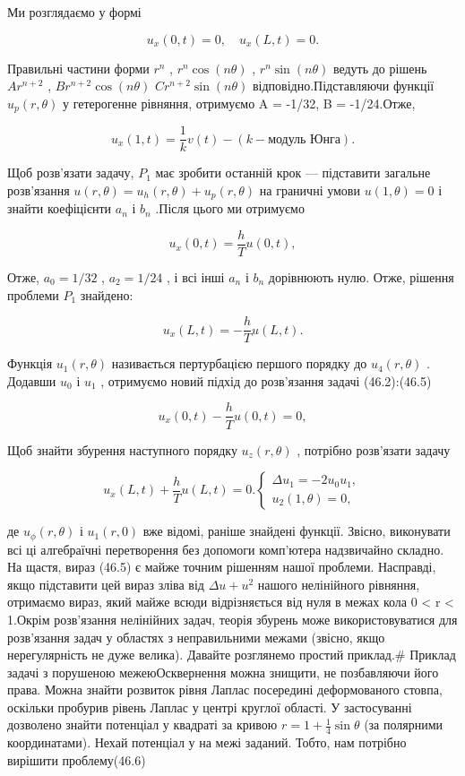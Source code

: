 \documentclass[
  ukrainian,
]{article}
\begin{document}
Ми розглядаємо у формі

\[
u_x(0, t) = 0, \quad u_x(L, t) = 0.
\]

Правильні частини форми \(r^n\) , \(r^n \cos{(n\theta)}\) ,
\(r^n \sin{(n\theta)}\) ведуть до рішень \(Ar^{n+2}\) ,
\(Br^{n+2} \cos{(n\theta)}\) \(Cr^{n+2} \sin{(n\theta)}\)
відповідно.Підставляючи функції \(u_p(r, \theta)\) у гетерогенне
рівняння, отримуємо A = -1/32, B = -1/24.Отже,

\[
u_{x}(1, t) = \frac{1}{k} v(t) - (k - \text{модуль Юнга}).
\]

Щоб розв'язати задачу, \(P_1\) має зробити останній крок --- підставити
загальне розв'язання \(u(r, \theta) = u_h(r, \theta) + u_p(r, \theta)\)
на граничні умови \(u(1, \theta) = 0\) і знайти коефіцієнти \(a_n\) і
\(b_n\) .Після цього ми отримуємо

\[
u_{x}(0, t) = \frac{h}{T} u(0, t),
\]

Отже, \(a_0=1/32\) , \(a_2=1/24\) , і всі інші \(a_n\) і \(b_n\)
дорівнюють нулю. Отже, рішення проблеми \(P_1\) знайдено:

\[
u_{x}(L, t) = -\frac{h}{T} u(L, t).
\]

Функція \(u_1(r, \theta)\) називається пертурбацією першого порядку до
\(u_4(r, \theta)\) . Додавши \(u_0\) і \(u_1\) , отримуємо новий підхід
до розв'язання задачі (46.2):(46.5)

\[
u_{x}(0, t) - \frac{h}{T}u(0, t) = 0,
\]

Щоб знайти збурення наступного порядку \(u_{z}(r, \theta)\) , потрібно
розв'язати задачу

\[
u_{x}(L, t) + \frac{h}{T}u(L, t) = 0.
\begin{cases} \Delta u_{1} = -2u_{0}u_{1}, \\ u_{2}(1, \theta) = 0, \end{cases}
\]

де \(u_{\phi}(r,\theta)\) і \(u_{1}(r,0)\) вже відомі, раніше знайдені
функції. Звісно, виконувати всі ці алгебраїчні перетворення без допомоги
комп'ютера надзвичайно складно. На щастя, вираз (46.5) є майже точним
рішенням нашої проблеми. Насправді, якщо підставити цей вираз зліва від
\(\Delta u + u^{2}\) нашого нелінійного рівняння, отримаємо вираз, який
майже всюди відрізняється від нуля в межах кола 0 \textless{} r
\textless{} 1.Окрім розв'язання нелінійних задач, теорія збурень може
використовуватися для розв'язання задач у областях з неправильними
межами (звісно, якщо нерегулярність не дуже велика). Давайте розглянемо
простий приклад.\# Приклад задачі з порушеною межеюОсквернення можна
знищити, не позбавляючи його права. Можна знайти розвиток рівня Лаплас
посередині деформованого стовпа, оскільки пробурив рівень Лаплас у
центрі круглої області. У застосуванні дозволено знайти потенціал у
квадраті за кривою \(r=1+\frac{1}{4}\sin\theta\) (за полярними
координатами). Нехай потенціал у на межі заданий. Тобто, нам потрібно
вирішити проблему(46.6)
\end{document}
